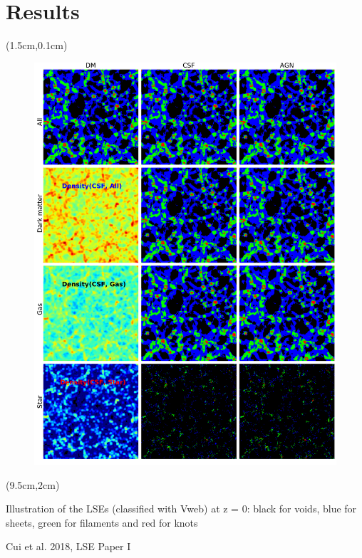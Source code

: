 \documentclass[aspectratio=169]{beamer}
\begin{document}
\section{Results}
\begin{frame}[plain,t]
\begin{textblock*}{6.5cm}(1.5cm,0.1cm)
\vspace{-0.3cm}
  \begin{figure}
    \includegraphics[height=\textheight]{image_show_V}
  \end{figure}
\end{textblock*}

\begin{textblock*}{5.5cm}(9.5cm,2cm)
{
{Illustration of the LSEs (classified with Vweb) at z = 0: black for voids, blue for sheets, green for filaments and red for knots}

\bigskip

Cui et al. 2018, LSE Paper I}
\end{textblock*}
\end{frame}
\end{document}
